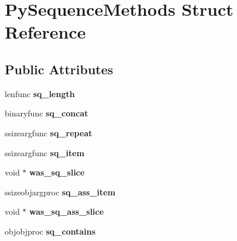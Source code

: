 \hypertarget{structPySequenceMethods}{}\section{Py\+Sequence\+Methods Struct Reference}
\label{structPySequenceMethods}
\subsection*{Public Attributes}
\begin{DoxyCompactItemize}
\item 
lenfunc {\bfseries sq\+\_\+length}\hypertarget{structPySequenceMethods_a065df8805c9fe2274312a52efa70461a}{}\label{structPySequenceMethods_a065df8805c9fe2274312a52efa70461a}

\item 
binaryfunc {\bfseries sq\+\_\+concat}\hypertarget{structPySequenceMethods_af1b354d31d0f760321715a678a1ade80}{}\label{structPySequenceMethods_af1b354d31d0f760321715a678a1ade80}

\item 
ssizeargfunc {\bfseries sq\+\_\+repeat}\hypertarget{structPySequenceMethods_afa5e868a77ebfd808b4286aea874230a}{}\label{structPySequenceMethods_afa5e868a77ebfd808b4286aea874230a}

\item 
ssizeargfunc {\bfseries sq\+\_\+item}\hypertarget{structPySequenceMethods_ab8d80a68cc44c06a10a746cd5242d943}{}\label{structPySequenceMethods_ab8d80a68cc44c06a10a746cd5242d943}

\item 
void $\ast$ {\bfseries was\+\_\+sq\+\_\+slice}\hypertarget{structPySequenceMethods_a7a3a31a89a34d4dd1e385360218f9f0a}{}\label{structPySequenceMethods_a7a3a31a89a34d4dd1e385360218f9f0a}

\item 
ssizeobjargproc {\bfseries sq\+\_\+ass\+\_\+item}\hypertarget{structPySequenceMethods_aba9bd4b6a8918934de3218a7b749cae4}{}\label{structPySequenceMethods_aba9bd4b6a8918934de3218a7b749cae4}

\item 
void $\ast$ {\bfseries was\+\_\+sq\+\_\+ass\+\_\+slice}\hypertarget{structPySequenceMethods_a6fa77611741f43e399656ffa0a3980df}{}\label{structPySequenceMethods_a6fa77611741f43e399656ffa0a3980df}

\item 
objobjproc {\bfseries sq\+\_\+contains}\hypertarget{structPySequenceMethods_ab2fdbfcc770f5f76d9e51c9ae790a18b}{}\label{structPySequenceMethods_ab2fdbfcc770f5f76d9e51c9ae790a18b}


\end{DoxyCompactItemize}
